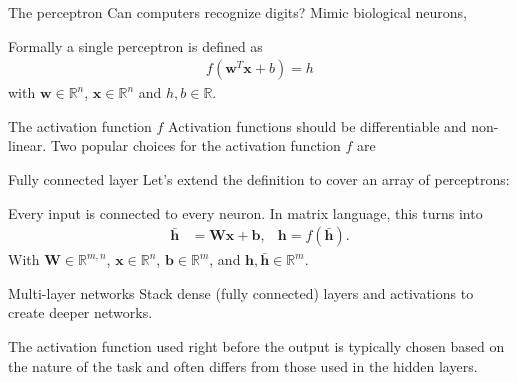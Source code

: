 \documentclass{beamer}
\begin{document}
    \begin{frame}{The perceptron}
      Can computers recognize digits? Mimic biological neurons,
      \begin{figure}
        
      \end{figure}
      Formally a single perceptron is defined as
      \begin{align}
        f(\mathbf{w}^T \mathbf{x} + b) = h
      \end{align}
      with $\mathbf{w} \in \mathbb{R}^n$, $\mathbf{x} \in \mathbb{R}^n$ and $h,b \in \mathbb{R}$. 
    \end{frame}

    \begin{frame}{The activation function $f$}
		 Activation functions should be differentiable and non-linear. Two popular choices for the activation function $f$ are
      \begin{figure}
        
        
      \end{figure}
    \end{frame}

    \begin{frame}{Fully connected layer}
      Let's extend the definition to cover an array of perceptrons:
      \begin{figure}
        
      \end{figure}
      Every input is connected to every neuron. In matrix language, this turns into
      \begin{align}
        \bar{\mathbf{h}} &= \mathbf{W}\mathbf{x} + \mathbf{b}, & \mathbf{h} = f(\bar{\mathbf{h}}).
      \end{align}
      With $\mathbf{W} \in \mathbb{R}^{m,n}$, $\mathbf{x} \in \mathbb{R}^{n}$, $\mathbf{b} \in \mathbb{R}^{m}$, and $\mathbf{h}, \bar{\mathbf{h}} \in \mathbb{R}^m$.
    \end{frame}
		
		\begin{frame}{Multi-layer networks}
      Stack dense (fully connected) layers and activations to create deeper networks. \\
      \begin{figure}
         
      \end{figure}
			The activation function used right before the output is typically chosen based on the nature of the task and often differs from those used in the hidden layers.
    \end{frame}
		
\end{document}
